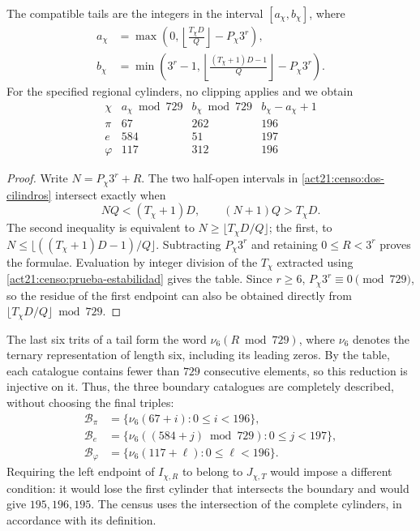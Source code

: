 \begin{proposition}
\label{act21:censo:catalogos}
The compatible tails are the integers in the interval \([a_\chi,b_\chi]\),
where
\begin{align}
 a_\chi&=\max\left(0,
       \left\lfloor\frac{T_\chi D}{Q}\right\rfloor-P_\chi3^r\right),
       \label{act21:censo:extremo-a}\\
 b_\chi&=\min\left(3^r-1,
       \left\lfloor\frac{(T_\chi+1)D-1}{Q}\right\rfloor-P_\chi3^r\right).
       \label{act21:censo:extremo-b}
\end{align}
For the specified regional cylinders, no clipping applies and we obtain
\begin{equation}
\begin{array}{c|r|r|r}
 \chi&a_\chi\bmod729&b_\chi\bmod729&b_\chi-a_\chi+1\\\hline
 \pi&67&262&196\\
 e&584&51&197\\
 \varphi&117&312&196
\end{array}
\label{act21:censo:tabla-catalogos}
\end{equation}
\end{proposition}
\begin{proof}
Write \(N=P_\chi3^r+R\). The two half-open intervals in
\eqref{act21:censo:dos-cilindros} intersect exactly when
\[
 NQ<(T_\chi+1)D,\qquad (N+1)Q>T_\chi D.
\]
The second inequality is equivalent to
\(N\geq\lfloor T_\chi D/Q\rfloor\); the first, to
\(N\leq\lfloor((T_\chi+1)D-1)/Q\rfloor\). Subtracting
\(P_\chi3^r\) and retaining \(0\leq R<3^r\) proves the formulae.
Evaluation by integer division of the \(T_\chi\) extracted using
\eqref{act21:censo:prueba-estabilidad} gives the table. Since \(r\geq6\),
\(P_\chi3^r\equiv0\pmod{729}\), so the residue of the first
endpoint can also be obtained directly from
\(\lfloor T_\chi D/Q\rfloor\bmod729\).
\end{proof}

The last six trits of a tail form the word
\(\nu_6(R\bmod729)\), where \(\nu_6\) denotes the ternary representation
of length six, including its leading zeros. By the table, each
catalogue contains fewer than \(729\) consecutive elements, so
this reduction is injective on it. Thus, the three boundary catalogues
are completely described, without choosing the final triples:
\begin{equation}
 \begin{split}
 \mathcal B_\pi&=\{\nu_6(67+i):0\leq i<196\},\\
 \mathcal B_e&=\{\nu_6((584+j)\bmod729):0\leq j<197\},\\
 \mathcal B_\varphi&=\{\nu_6(117+\ell):0\leq\ell<196\}.
 \end{split}
 \label{act21:censo:fronteras-explicitas}
\end{equation}
Requiring the left endpoint of \(I_{\chi,R}\) to belong to
\(J_{\chi,T}\) would impose a different condition: it would lose the first cylinder
that intersects the boundary and would give \(195,196,195\). The census uses the
intersection of the complete cylinders, in accordance with its definition.

